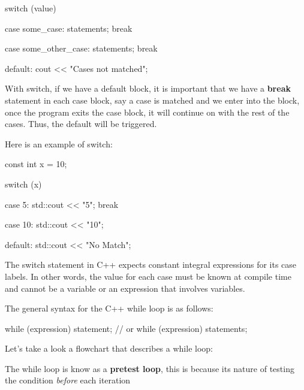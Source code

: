 \documentclass{report}
\begin{document}
    \begin{cppcode}
switch (value){
    case some_case:
        statements;
        break

    case some_other_case:
        statements;
        break

    default:
        cout << "Cases not matched";
}
    \end{cppcode}
    
    \bigbreak \noindent 
    \begin{notebox}
        With switch, if we have a default block, it is important that we have a \textbf{break} statement in each case block, say a case is matched and we enter into the block, once the program exits the case block, it will continue on with the rest of the cases. Thus, the default will be triggered.
    \end{notebox}
    
    \bigbreak \noindent 
    Here is an example of switch:
    \bigbreak \noindent 
    
    \begin{cppcode}
const int x = 10;

switch (x) {
    case 5:
        std::cout << "5";
        break

    case 10:
        std::cout << "10";

    default:
        std::cout << "No Match";
}
    \end{cppcode}
    
    \bigbreak \noindent 
    \begin{notebox}
			The switch statement in C++ expects constant integral expressions for its case labels. In other words, the value for each case must be known at compile time and cannot be a variable or an expression that involves variables.
		\end{notebox}

    \pagebreak
    \bigbreak \noindent 
    The general syntax for the C++ while loop is as follows:
    \bigbreak \noindent 
    
    \begin{cppcode}
while (expression)
    statement;
// or
while (expression) {
    statements;
}
    \end{cppcode}
    
    \bigbreak \noindent 
    \begin{minipage}[]{0.47\textwidth}
        Let's take a look a flowchart that describes a while loop:
    \end{minipage}
    \begin{minipage}[]{0.47\textwidth}
    \end{minipage}
    \bigbreak \noindent 
    \begin{notebox}
        The while loop is know as a \textbf{pretest loop}, this is because its nature of testing the condition \textit{before} each iteration
    \end{notebox}
\end{document}
